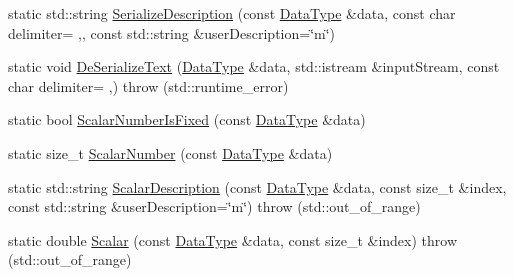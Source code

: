 \begin{DoxyCompactItemize}
\item 
static std\+::string \hyperlink{classcmn_data_3_01vct_fixed_size_matrix_3_01__element_type_00_01__rows_00_01__cols_00_01__row_major_01_4_01_4_acfc18a178f20a66080efa93b462a84e1}{Serialize\+Description} (const \hyperlink{classcmn_data_3_01vct_fixed_size_matrix_3_01__element_type_00_01__rows_00_01__cols_00_01__row_major_01_4_01_4_a6b06110fd1bb7049b72ce21275dd8aee}{Data\+Type} \&data, const char delimiter= \textquotesingle{},\textquotesingle{}, const std\+::string \&user\+Description=\char`\"{}m\char`\"{})
\item 
static void \hyperlink{classcmn_data_3_01vct_fixed_size_matrix_3_01__element_type_00_01__rows_00_01__cols_00_01__row_major_01_4_01_4_ac1b8d6ae710ee2c4c639beac5cfbba29}{De\+Serialize\+Text} (\hyperlink{classcmn_data_3_01vct_fixed_size_matrix_3_01__element_type_00_01__rows_00_01__cols_00_01__row_major_01_4_01_4_a6b06110fd1bb7049b72ce21275dd8aee}{Data\+Type} \&data, std\+::istream \&input\+Stream, const char delimiter= \textquotesingle{},\textquotesingle{})  throw (std\+::runtime\+\_\+error)
\item 
static bool \hyperlink{classcmn_data_3_01vct_fixed_size_matrix_3_01__element_type_00_01__rows_00_01__cols_00_01__row_major_01_4_01_4_a590d2f67a86980fc56360b18015b43de}{Scalar\+Number\+Is\+Fixed} (const \hyperlink{classcmn_data_3_01vct_fixed_size_matrix_3_01__element_type_00_01__rows_00_01__cols_00_01__row_major_01_4_01_4_a6b06110fd1bb7049b72ce21275dd8aee}{Data\+Type} \&data)
\item 
static size\+\_\+t \hyperlink{classcmn_data_3_01vct_fixed_size_matrix_3_01__element_type_00_01__rows_00_01__cols_00_01__row_major_01_4_01_4_a3e8c4121814f1969d87e7117e4b4b7d7}{Scalar\+Number} (const \hyperlink{classcmn_data_3_01vct_fixed_size_matrix_3_01__element_type_00_01__rows_00_01__cols_00_01__row_major_01_4_01_4_a6b06110fd1bb7049b72ce21275dd8aee}{Data\+Type} \&data)
\item 
static std\+::string \hyperlink{classcmn_data_3_01vct_fixed_size_matrix_3_01__element_type_00_01__rows_00_01__cols_00_01__row_major_01_4_01_4_a663cae5c86cbea6d91b0531e721a8ab6}{Scalar\+Description} (const \hyperlink{classcmn_data_3_01vct_fixed_size_matrix_3_01__element_type_00_01__rows_00_01__cols_00_01__row_major_01_4_01_4_a6b06110fd1bb7049b72ce21275dd8aee}{Data\+Type} \&data, const size\+\_\+t \&index, const std\+::string \&user\+Description=\char`\"{}m\char`\"{})  throw (std\+::out\+\_\+of\+\_\+range)
\item 
static double \hyperlink{classcmn_data_3_01vct_fixed_size_matrix_3_01__element_type_00_01__rows_00_01__cols_00_01__row_major_01_4_01_4_a48e57341b50b85d875d80061fffc266d}{Scalar} (const \hyperlink{classcmn_data_3_01vct_fixed_size_matrix_3_01__element_type_00_01__rows_00_01__cols_00_01__row_major_01_4_01_4_a6b06110fd1bb7049b72ce21275dd8aee}{Data\+Type} \&data, const size\+\_\+t \&index)  throw (std\+::out\+\_\+of\+\_\+range)
\end{DoxyCompactItemize}


